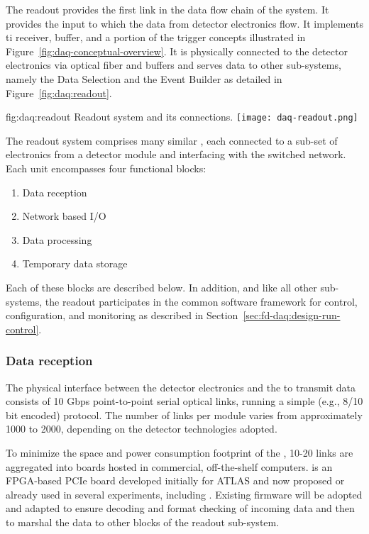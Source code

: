 The readout provides the first link in the data flow chain of the  system.
It provides the input to which the data from detector electronics flow.
It implements ti receiver, buffer, and a portion of the trigger concepts illustrated in Figure~\ref{fig:daq-conceptual-overview}.
It is physically connected to the detector electronics via optical fiber and buffers and serves data to other  sub-systems, namely the Data Selection and the Event Builder as detailed in Figure~\ref{fig:daq:readout}.


\begin{dunefigure}{fig:daq:readout}{  Readout system and its connections.}
  \texttt{[image: daq-readout.png]}
\end{dunefigure}

The readout system comprises many similar , each connected to a sub-set of electronics from a detector module and interfacing with the  switched network.  Each unit encompasses four functional blocks:

\begin{enumerate}
\item Data reception
\item Network based I/O
\item Data processing
\item Temporary data storage
\end{enumerate}

Each of these blocks are described below.  In addition, and like all other  sub-systems, the readout participates in the common software framework for control, configuration, and monitoring as described in Section~\ref{sec:fd-daq:design-run-control}.

\subsubsection{Data reception}

The physical interface between the detector electronics and the  to transmit data consists of 10 Gbps point-to-point serial optical links, running a simple (e.g., 8/10 bit encoded) protocol. 
The number of links per  module varies from approximately 1000 to 2000, depending on the detector technologies adopted.

To minimize the space and power consumption footprint of the , 10-20 links are aggregated into  boards hosted in commercial, off-the-shelf computers.
 is an FPGA-based PCIe board developed initially for ATLAS and now proposed or already used in several experiments, including . 
Existing firmware will be adopted and adapted to ensure decoding and format checking of incoming data and then to marshal the data to other blocks of the readout sub-system.

